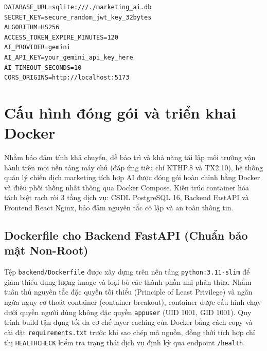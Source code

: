 \begin{footnotesize}
\begin{verbatim}
DATABASE_URL=sqlite:///./marketing_ai.db          SECRET_KEY=secure_random_jwt_key_32bytes
ALGORITHM=HS256                                  ACCESS_TOKEN_EXPIRE_MINUTES=120
AI_PROVIDER=gemini                               AI_API_KEY=your_gemini_api_key_here
AI_TIMEOUT_SECONDS=10                            CORS_ORIGINS=http://localhost:5173
\end{verbatim}
\end{footnotesize}

\section{Cấu hình đóng gói và triển khai Docker}\label{sec:v8-docker-packaging}

Nhằm bảo đảm tính khả chuyển, dễ bảo trì và khả năng tái lập môi trường vận hành trên mọi nền tảng máy chủ (đáp ứng tiêu chí KTHP.8 và TX2.10), hệ thống quản lý chiến dịch marketing tích hợp AI được đóng gói hoàn chỉnh bằng Docker và điều phối thống nhất thông qua Docker Compose. Kiến trúc container hóa tách biệt rạch ròi 3 tầng dịch vụ: CSDL PostgreSQL 16, Backend FastAPI và Frontend React Nginx, bảo đảm nguyên tắc cô lập và an toàn thông tin.

\subsection{Dockerfile cho Backend FastAPI (Chuẩn bảo mật Non-Root)}\label{subsec:v8-docker-backend}

Tệp \texttt{backend/Dockerfile} được xây dựng trên nền tảng \texttt{python:3.11-slim} để giảm thiểu dung lượng image và loại bỏ các thành phần nhị phân thừa. Nhằm tuân thủ nguyên tắc đặc quyền tối thiểu (Principle of Least Privilege) và ngăn ngừa nguy cơ thoát container (container breakout), container được cấu hình chạy dưới quyền người dùng không đặc quyền \texttt{appuser} (UID 1001, GID 1001). Quy trình build tận dụng tối đa cơ chế layer caching của Docker bằng cách copy và cài đặt \texttt{requirements.txt} trước khi sao chép mã nguồn, đồng thời tích hợp chỉ thị \texttt{HEALTHCHECK} kiểm tra trạng thái dịch vụ định kỳ qua endpoint \texttt{/health}.

